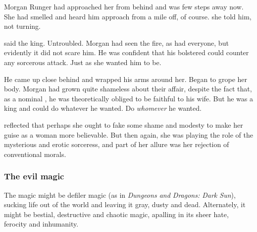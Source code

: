 \begin{prose}
  Morgan Runger had approached her from behind and was few steps away now. 
  She had smelled and heard him approach from a mile off, of course. 
   she told him, not turning. 
  
   said the king. 
  Untroubled. 
  Morgan had seen the fire, as had everyone, but evidently it did not scare him. 
  He was confident that his bolstered \ishrah{} could counter any sorcerous attack. 
  Just as she wanted him to be. 
  
  He came up close behind and wrapped his arms around her. 
  Began to grope her body. 
  Morgan had grown quite shameless about their affair, despite the fact that, as a nominal \Iquinian, he was theoretically obliged to be faithful to his wife. 
  But he was a king and could do whatever he wanted. 
  Do \emph{whomever} he wanted. 
  
  \Takestsha{} reflected that perhaps she ought to fake some shame and modesty to make her guise as a \human{} woman more believable. 
  But then again, she was playing the role of the mysterious and erotic sorceress, and part of her allure was her rejection of conventional morals. 
  
\end{prose}






\subsubsection{The evil magic}
The \Rungertemple{} magic might be defiler magic (as in \emph{Dungeons and Dragons: Dark Sun}), sucking life out of the world and leaving it gray, dusty and dead. Alternately, it might be bestial, destructive and chaotic magic, apalling in its sheer hate, ferocity and inhumanity. 


